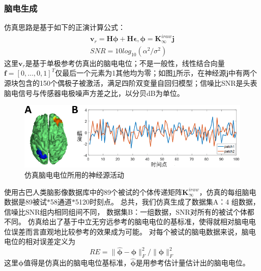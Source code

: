 \subsubsection{脑电生成}
仿真思路是基于如下的正演计算公式：
\begin{equation}\label{eq3.18}
\begin{split}
\mathbf{v}_r=\mathbf{H\phi}+\mathbf{H\epsilon},\mathbf{\phi}=\mathbf{K}_{\infty}^{iraw}\mathbf{j}\\
SNR=10log_{10}(\alpha^2/\sigma^2)
\end{split}
\end{equation}
这里$\mathbf{v}_r$是基于单极参考仿真出的脑电电位；不是一般性，线性结合向量$\mathbf{f}=[0,...,0,1]^T$仅最后一个元素为1其他均为零；如图\ref{3.3}所示，在神经源$\mathbf{j}$中有两个源块包含的150个偶极子被激活，满足四阶双变量自回归模型；信噪比SNR是头表脑电信号与传感器电极噪声方差之比，以分贝dB为单位。
\begin{figure}[!ht]
	\centering
	\includegraphics[width=15cm]{pic/Frontier/figure3.png}
	\caption{仿真脑电电位所用的神经源活动}
	\label{3.3}
\end{figure}
使用古巴人类脑影像数据库中的89个被试的个体传递矩阵$\mathbf{K}_{\infty}^{iraw}$，仿真的每组脑电数据是89被试$\ast$58通道$\ast$5120时刻点。 总共，我们仿真生成了数据集A：4 组数据，信噪比SNR组内相同组间不同， 数据集B：一组数据，SNR对所有的被试个体都不同。 仿真给出了基于中立无穷远参考的脑电电位的基标准，使得就相对脑电电位误差而言直观地比较参考的效果成为可能。 对每个被试的脑电数据来说，脑电电位的相对误差定义为
\begin{equation}\label{eq3.19}
RE=\lVert\hat{\mathbf{\phi}}-\mathbf{\phi}\rVert^2_F/{\lVert\mathbf{\phi}\rVert^2_F}
\end{equation}
这里$\mathbf{\phi}$值得是仿真出的脑电电位基标准，$\hat{\mathbf{\phi}}$是用参考估计量估计出的脑电电位。

